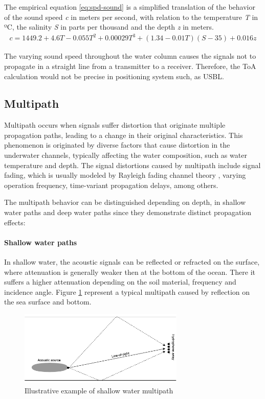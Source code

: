 The empirical equation \ref{eq:spd-sound} \cite{ocean-acoust} is a simplified translation of the behavior of the sound speed \textit{c} in meters per second, with relation to the temperature \textit{T} in ºC, the salinity \textit{S} in parts per thousand and the depth \textit{z} in meters. 
\begin{eqnarray}
c = 1449.2 + 4.6T - 0.055T^2 + 0.00029T^3 + (1.34 - 0.01T)(S-35) + 0.016z 
\label{eq:spd-sound}
\end{eqnarray}

The varying sound speed throughout the water column causes the signals not to propagate in a straight line from a transmitter to a receiver. Therefore, the ToA calculation would not be precise in positioning system such, as USBL.

\subsection{Multipath} \label{subsec:multipath}

Multipath occurs when signals suffer distortion that originate multiple propagation paths, leading to a change in their original characteristics. This phenomenon is originated by diverse factors that cause distortion in the underwater channels, typically affecting the water composition, such as water temperature and depth. The signal distortions caused by multipath include signal fading, which is usually modeled by Rayleigh fading channel theory \cite{multipath-rayleigh-models}, varying operation frequency, time-variant propagation delays, among others.

The multipath behavior can be distinguished depending on depth, in shallow water paths and deep water paths since they demonstrate distinct propagation effects: 

\paragraph{Shallow water paths} In shallow water, the acoustic signals can be reflected or refracted on the surface, where attenuation is generally weaker then at the bottom of the ocean. There it suffers a higher attenuation depending on the soil material, frequency and incidence angle. Figure \ref{fig:mpath} represent a typical multipath caused by reflection on the sea surface and bottom. 

\begin{figure}[!htbp]
	\centering
	\includegraphics[width=0.7\textwidth]{figures/multipath}
	\caption{Illustrative example of shallow water multipath}
	\label{fig:mpath}
\end{figure}


